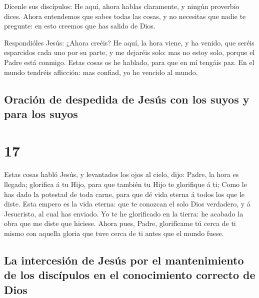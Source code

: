  Dícenle sus discípulos: He aquí, ahora hablas
claramente, y ningún proverbio dices.  Ahora entendemos
que sabes todas las cosas, y no necesitas que nadie te pregunte: en esto
creemos que has salido de Dios.

 Respondióles Jesús: ¿Ahora creéis?  He
aquí, la hora viene, y ha venido, que seréis esparcidos cada uno por su
parte, y me dejaréis solo: mas no estoy solo, porque el Padre está
conmigo.  Estas cosas os he hablado, para que en mí
tengáis paz. En el mundo tendréis aflicción: mas confiad, yo he vencido
al mundo.

\hypertarget{oraciuxf3n-de-despedida-de-jesuxfas-con-los-suyos-y-para-los-suyos}{%
\subsection{Oración de despedida de Jesús con los suyos y para los
suyos}\label{oraciuxf3n-de-despedida-de-jesuxfas-con-los-suyos-y-para-los-suyos}}

\hypertarget{section-16}{%
\section{17}\label{section-16}}

 Estas cosas habló Jesús, y levantados los ojos al cielo,
dijo: Padre, la hora es llegada; glorifica á tu Hijo, para que también
tu Hijo te glorifique á ti;  Como le has dado la potestad
de toda carne, para que dé vida eterna á todos los que le diste.
 Esta empero es la vida eterna: que te conozcan el solo
Dios verdadero, y á Jesucristo, al cual has enviado.  Yo
te he glorificado en la tierra: he acabado la obra que me diste que
hiciese.  Ahora pues, Padre, glorifícame tú cerca de ti
mismo con aquella gloria que tuve cerca de ti antes que el mundo fuese.

\hypertarget{la-intercesiuxf3n-de-jesuxfas-por-el-mantenimiento-de-los-discuxedpulos-en-el-conocimiento-correcto-de-dios}{%
\subsection{La intercesión de Jesús por el mantenimiento de los
discípulos en el conocimiento correcto de
Dios}\label{la-intercesiuxf3n-de-jesuxfas-por-el-mantenimiento-de-los-discuxedpulos-en-el-conocimiento-correcto-de-dios}}

